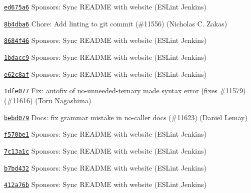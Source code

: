 \begin{DoxyItemize}
\item \href{https://github.com/eslint/eslint/commit/ed675a6e5ac42898555c51a7cf771b79695ba591}{\texttt{ {\ttfamily ed675a6}}} Sponsors\+: Sync R\+E\+A\+D\+ME with website (E\+S\+Lint Jenkins)
\item \href{https://github.com/eslint/eslint/commit/8b4dba606f8306f8ad0a37e2174a6e3236f7ebe7}{\texttt{ {\ttfamily 8b4dba6}}} Chore\+: Add linting to git commit (\#11556) (Nicholas C. Zakas)
\item \href{https://github.com/eslint/eslint/commit/8684f4646da33bfe81e8f7f8c2d1af8b31065564}{\texttt{ {\ttfamily 8684f46}}} Sponsors\+: Sync R\+E\+A\+D\+ME with website (E\+S\+Lint Jenkins)
\item \href{https://github.com/eslint/eslint/commit/1bdacc9b703158d5ca3563e4a9b67bb8453ac316}{\texttt{ {\ttfamily 1bdacc9}}} Sponsors\+: Sync R\+E\+A\+D\+ME with website (E\+S\+Lint Jenkins)
\item \href{https://github.com/eslint/eslint/commit/e62c8af6a86e35dc05f30713faf87a18cc77714d}{\texttt{ {\ttfamily e62c8af}}} Sponsors\+: Sync R\+E\+A\+D\+ME with website (E\+S\+Lint Jenkins)
\item \href{https://github.com/eslint/eslint/commit/1dfe077b7e47c6090277eb984e08bd472bb5595e}{\texttt{ {\ttfamily 1dfe077}}} Fix\+: autofix of no-\/unneeded-\/ternary made syntax error (fixes \#11579) (\#11616) (Toru Nagashima)
\item \href{https://github.com/eslint/eslint/commit/bebd0793eaf122b013cca501ff2c6b0fc05d5493}{\texttt{ {\ttfamily bebd079}}} Docs\+: fix grammar mistake in no-\/caller docs (\#11623) (Daniel Lemay)
\item \href{https://github.com/eslint/eslint/commit/f570be17b339cb7622c512331b1653013279855a}{\texttt{ {\ttfamily f570be1}}} Sponsors\+: Sync R\+E\+A\+D\+ME with website (E\+S\+Lint Jenkins)
\item \href{https://github.com/eslint/eslint/commit/7c13a1c144a6a7c99cd9338a24166da9f7439cd0}{\texttt{ {\ttfamily 7c13a1c}}} Sponsors\+: Sync R\+E\+A\+D\+ME with website (E\+S\+Lint Jenkins)
\item \href{https://github.com/eslint/eslint/commit/b7bd432e1161feba8dbb81f62cf03cafad42c3d4}{\texttt{ {\ttfamily b7bd432}}} Sponsors\+: Sync R\+E\+A\+D\+ME with website (E\+S\+Lint Jenkins)
\item \href{https://github.com/eslint/eslint/commit/412a76b316e05ca85334c1d6bc6372df536da2db}{\texttt{ {\ttfamily 412a76b}}} Sponsors\+: Sync R\+E\+A\+D\+ME with website (E\+S\+Lint Jenkins)
\end{DoxyItemize}


